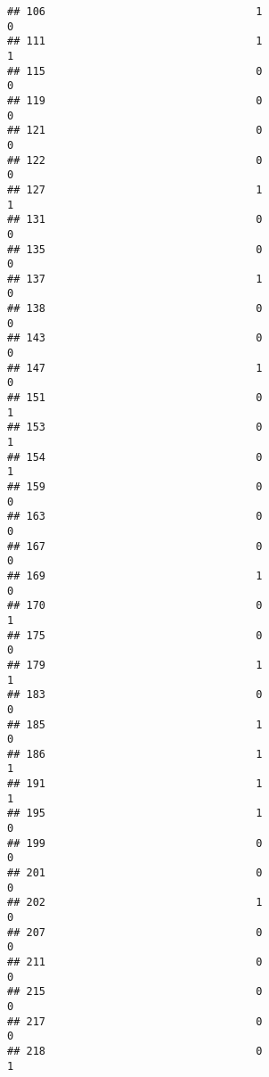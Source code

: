 \documentclass[
]{article}
\begin{document}
\begin{verbatim}
## 106                                 1                                0
## 111                                 1                                1
## 115                                 0                                0
## 119                                 0                                0
## 121                                 0                                0
## 122                                 0                                0
## 127                                 1                                1
## 131                                 0                                0
## 135                                 0                                0
## 137                                 1                                0
## 138                                 0                                0
## 143                                 0                                0
## 147                                 1                                0
## 151                                 0                                1
## 153                                 0                                1
## 154                                 0                                1
## 159                                 0                                0
## 163                                 0                                0
## 167                                 0                                0
## 169                                 1                                0
## 170                                 0                                1
## 175                                 0                                0
## 179                                 1                                1
## 183                                 0                                0
## 185                                 1                                0
## 186                                 1                                1
## 191                                 1                                1
## 195                                 1                                0
## 199                                 0                                0
## 201                                 0                                0
## 202                                 1                                0
## 207                                 0                                0
## 211                                 0                                0
## 215                                 0                                0
## 217                                 0                                0
## 218                                 0                                1

\end{verbatim}
\end{document}
